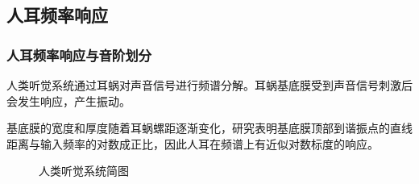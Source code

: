 \documentclass[utf8,10pt]{beamer}
\begin{document}
\subsection{人耳频率响应}
\begin{frame}
    \frametitle{人耳频率响应与音阶划分}

    人类听觉系统通过耳蜗对声音信号进行频谱分解。耳蜗基底膜受到声音信号刺激后会发生响应，产生振动。

    基底膜的宽度和厚度随着耳蜗螺距逐渐变化，研究表明基底膜顶部到谐振点的直线距离与输入频率的对数成正比，因此人耳在频谱上有近似对数标度的响应。

    \begin{figure}[htpb]
        \centering
        \hfill
        \caption{人类听觉系统简图}
        \label{fig:acoustic_system}
    \end{figure}

\end{frame}
\end{document}
